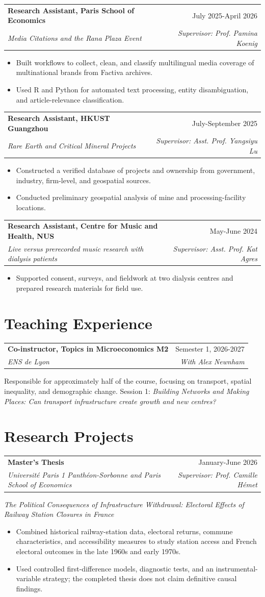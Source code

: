 \documentclass[11pt,letterpaper]{article}
\makeatletter
\newcommand{\entry}[4]{%
  \begin{tabularx}{\textwidth}{@{}Xr@{}}
    \textbf{#1} & \textcolor{muted}{#2} \\
    \textit{#3} & \textit{\textcolor{muted}{#4}}
  \end{tabularx}\vspace{2pt}
}
\makeatother
\begin{document}
\entry{Research Assistant, Paris School of Economics}{July 2025-April 2026}{Media Citations and the Rana Plaza Event}{Supervisor: Prof. Pamina Koenig}
\begin{itemize}
  \item Built workflows to collect, clean, and classify multilingual media coverage of multinational brands from Factiva archives.
  \item Used R and Python for automated text processing, entity disambiguation, and article-relevance classification.
\end{itemize}

\entry{Research Assistant, HKUST Guangzhou}{July-September 2025}{Rare Earth and Critical Mineral Projects}{Supervisor: Asst. Prof. Yangsiyu Lu}
\begin{itemize}
  \item Constructed a verified database of projects and ownership from government, industry, firm-level, and geospatial sources.
  \item Conducted preliminary geospatial analysis of mine and processing-facility locations.
\end{itemize}

\entry{Research Assistant, Centre for Music and Health, NUS}{May-June 2024}{Live versus prerecorded music research with dialysis patients}{Supervisor: Asst. Prof. Kat Agres}
\begin{itemize}
  \item Supported consent, surveys, and fieldwork at two dialysis centres and prepared research materials for field use.
\end{itemize}

\newpage
\section*{Teaching Experience}
\entry{Co-instructor, Topics in Microeconomics M2}{Semester 1, 2026-2027}{ENS de Lyon}{With Alex Newnham}
Responsible for approximately half of the course, focusing on transport, spatial inequality, and demographic change. Session 1: \textit{Building Networks and Making Places: Can transport infrastructure create growth and new centres?}

\section*{Research Projects}
\entry{Master's Thesis}{January-June 2026}{Université Paris 1 Panthéon-Sorbonne and Paris School of Economics}{Supervisor: Prof. Camille Hémet}
\textit{The Political Consequences of Infrastructure Withdrawal: Electoral Effects of Railway Station Closures in France}
\begin{itemize}
  \item Combined historical railway-station data, electoral returns, commune characteristics, and accessibility measures to study station access and French electoral outcomes in the late 1960s and early 1970s.
  \item Used controlled first-difference models, diagnostic tests, and an instrumental-variable strategy; the completed thesis does not claim definitive causal findings.
\end{itemize}
\end{document}
